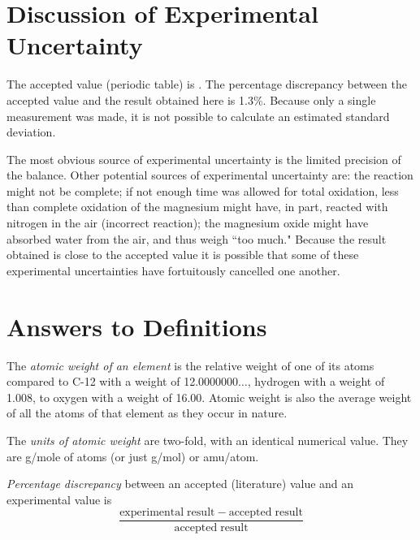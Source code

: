 \documentclass{article}
\begin{document}
{%

\section{Discussion of Experimental Uncertainty}

The accepted value (periodic table) is  \cite{Smith:2012qr}. The percentage discrepancy between the accepted value and the result obtained here is 1.3\%. Because only a single measurement was made, it is not possible to calculate an estimated standard deviation.

The most obvious source of experimental uncertainty is the limited precision of the balance. Other potential sources of experimental uncertainty are: the reaction might not be complete; if not enough time was allowed for total oxidation, less than complete oxidation of the magnesium might have, in part, reacted with nitrogen in the air (incorrect reaction); the magnesium oxide might have absorbed water from the air, and thus weigh ``too much." Because the result obtained is close to the accepted value it is possible that some of these experimental uncertainties have fortuitously cancelled one another.


\section{Answers to Definitions}

\begin{enumerate}
\begin{item}
The \emph{atomic weight of an element} is the relative weight of one of its atoms compared to C-12 with a weight of 12.0000000$\ldots$, hydrogen with a weight of 1.008, to oxygen with a weight of 16.00. Atomic weight is also the average weight of all the atoms of that element as they occur in nature.
\end{item}
\begin{item}
The \emph{units of atomic weight} are two-fold, with an identical numerical value. They are g/mole of atoms (or just g/mol) or amu/atom.
\end{item}
\begin{item}
\emph{Percentage discrepancy} between an accepted (literature) value and an experimental value is
\begin{equation*}
\frac{\mathrm{experimental\;result} - \mathrm{accepted\;result}}{\mathrm{accepted\;result}}
\end{equation*}
\end{item}
\end{enumerate}

}
\end{document}
